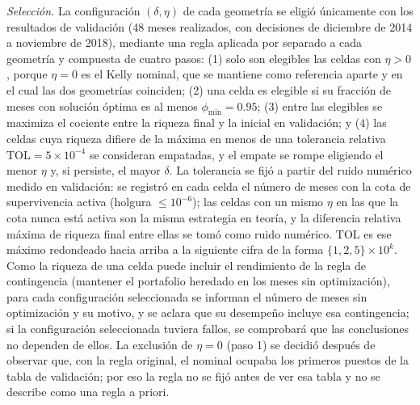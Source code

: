 \emph{Selección.} La configuración $(\delta,\eta)$ de cada geometría se eligió únicamente con los resultados de validación (48 meses realizados, con decisiones de diciembre de 2014 a noviembre de 2018), mediante una regla aplicada por separado a cada geometría y compuesta de cuatro pasos: (1) solo son elegibles las celdas con $\eta>0$, porque $\eta=0$ es el Kelly nominal, que se mantiene como referencia aparte y en el cual las dos geometrías coinciden; (2) una celda es elegible si su fracción de meses con solución óptima es al menos $\phi_{\min}=0.95$; (3) entre las elegibles se maximiza el cociente entre la riqueza final y la inicial en validación; y (4) las celdas cuya riqueza difiere de la máxima en menos de una tolerancia relativa $\mathrm{TOL}=5\times10^{-4}$ se consideran empatadas, y el empate se rompe eligiendo el menor $\eta$ y, si persiste, el mayor $\delta$. La tolerancia se fijó a partir del ruido numérico medido en validación: se registró en cada celda el número de meses con la cota de supervivencia activa (holgura $\le10^{-6}$); las celdas con un mismo $\eta$ en las que la cota nunca está activa son la misma estrategia en teoría, y la diferencia relativa máxima de riqueza final entre ellas se tomó como ruido numérico. $\mathrm{TOL}$ es ese máximo redondeado hacia arriba a la siguiente cifra de la forma $\{1,2,5\}\times10^{k}$. Como la riqueza de una celda puede incluir el rendimiento de la regla de contingencia (mantener el portafolio heredado en los meses sin optimización), para cada configuración seleccionada se informan el número de meses sin optimización y su motivo, y se aclara que su desempeño incluye esa contingencia; si la configuración seleccionada tuviera fallos, se comprobará que las conclusiones no dependen de ellos. 
La exclusión de $\eta=0$ (paso 1) se decidió después de observar que, con la regla original, el nominal ocupaba los primeros puestos de la tabla de validación; por eso la regla no se fijó antes de ver esa tabla y no se describe como una regla a priori. 
